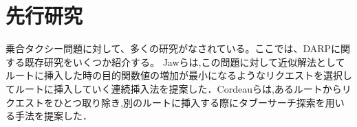 \chapter{先行研究}\label{previous_research}
乗合タクシー問題に対して、多くの研究がなされている。ここでは、DARPに関する既存研究をいくつか紹介する。
Jawらは,この問題に対して近似解法としてルートに挿入した時の目的関数値の増加が最小になるようなリクエストを選択してルートに挿入していく連続挿入法を提案した\cite{insertion}．Cordeauらは,あるルートからリクエストをひとつ取り除き,別のルートに挿入する際にタブーサーチ探索を用いる手法を提案した\cite{tabu}．
